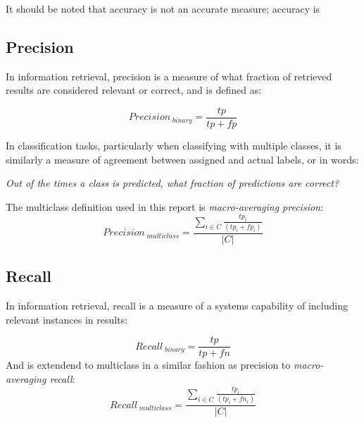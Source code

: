 \documentclass[a4paper,11pt]{kth-mag}
\begin{document}
It should be noted that accuracy is not an accurate measure; accuracy is 





\subsection{Precision}
In information retrieval, precision is a measure of what fraction of retrieved
results are considered relevant or correct, and is defined as\cite{rijsbergen1979v}:

\begin{equation} \label{eq:precision}
Precision_{\;binary} =  \frac{tp}{tp + fp}
\end{equation}

In classification tasks, particularly when classifying with multiple classes,
it is similarly a measure of agreement between assigned and actual labels,
or in words:

\emph{Out of the times a class is predicted, what fraction of predictions are correct?}


The multiclass definition used in this report is \emph{macro-averaging precision}\cite{sokolova2009systematic}:
\begin{equation} \label{eq:multiprecision}
Precision_{\;multiclass} =  \frac{\sum_{i \in C} \frac{ tp_i}{(tp_i + fp_i)}}{|C|}
\end{equation}


\subsection{Recall}
In information retrieval, recall is a measure of a systems capability of including
relevant instances in results\cite{rijsbergen1979v}:

\begin{equation} \label{eq:recall}
Recall_{\;binary} = \frac{tp}{tp + fn}
\end{equation}
And is extendend to multiclass in a similar fashion as precision to \emph{macro-averaging recall}\cite{sokolova2009systematic}:
\begin{equation} \label{eq:multirecall}
Recall_{\;multiclass} =  \frac{\sum_{i \in C} \frac{ tp_i}{(tp_i + fn_i)}}{|C|}
\end{equation}
\end{document}
